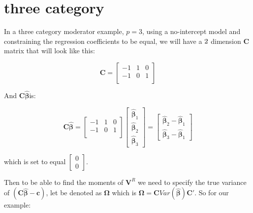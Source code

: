  \section{three category}



 In a three category moderator example, $p=3$,  using a no-intercept model and constraining the regression coefficients to be equal, we will have a $2 \time 3$ dimension $\mathbf{C}$ matrix that will look like this:

 \begin{equation}
     \mathbf{C} = 
     \begin{bmatrix} 
     -1 & 1 & 0\\
     -1 & 0 & 1\\
     \end{bmatrix}
 \end{equation}

And $\mathbf{C}\mathbf{\hat{\beta}}$is:

 \begin{equation}
     \mathbf{C} \mathbf{\hat{\beta}}= 
     \begin{bmatrix} 
     -1 & 1 & 0\\
     -1 & 0 & 1\\
     \end{bmatrix}\begin{bmatrix}\mathbf{\hat{\beta}}_1 \\
     \mathbf{\hat{\beta}}_2 \\ \mathbf{\hat{\beta}}_3\end{bmatrix}  = \begin{bmatrix}
         \mathbf{\hat{\beta}}_2 - \mathbf{\hat{\beta}}_1 \\
         \mathbf{\hat{\beta}}_3 - \mathbf{\hat{\beta}}_1
     \end{bmatrix}
 \end{equation}

 which is set to equal $\begin{bmatrix}
     0 \\ 0 
 \end{bmatrix}$. 

 Then to be able to find the moments of $\mathbf{V}^R$ we need to specify the true variance of $(\mathbf{C}\mathbf{\hat{\beta}}-\mathbf{c})$, let be denoted as $\mathbf{\Omega}$ which is $\mathbf{\Omega} = \mathbf{C}Var(\mathbf{\hat{\beta}}) \mathbf{C}'$. So for our example:

